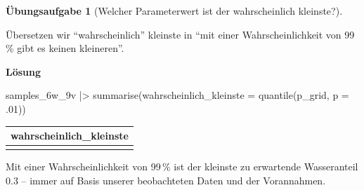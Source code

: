 \documentclass[
  ngerman,
  letterpaper,
  twoside,
  open=any]{scrbook}
\newenvironment{Shaded}{\begin{snugshade}}{\end{snugshade}}
\newcommand{\AttributeTok}[1]{\textcolor[rgb]{0.40,0.45,0.13}{#1}}
\newcommand{\DecValTok}[1]{\textcolor[rgb]{0.68,0.00,0.00}{#1}}
\newcommand{\FunctionTok}[1]{\textcolor[rgb]{0.28,0.35,0.67}{#1}}
\newcommand{\NormalTok}[1]{\textcolor[rgb]{0.00,0.23,0.31}{#1}}
\newcommand{\SpecialCharTok}[1]{\textcolor[rgb]{0.37,0.37,0.37}{#1}}
\newcounter{none} %
\theoremstyle{definition}
\theoremstyle{plain}
\theoremstyle{definition}
\newtheorem{exercise}{Übungsaufgabe}[chapter]
\theoremstyle{definition}
\theoremstyle{definition}
\theoremstyle{definition}
\newtheorem{exercise}{Übungsaufgabe}[chapter]
\theoremstyle{remark}
\begin{document}
\begin{exercise}[Welcher Parameterwert ist der wahrscheinlich
kleinste?]\protect\hypertarget{exr-quant2}{}\label{exr-quant2}

Übersetzen wir \enquote{wahrscheinlich} kleinste in \enquote{mit einer
Wahrscheinlichkeit von 99\,\% gibt es keinen kleineren}.

\begin{tcolorbox}[enhanced jigsaw, arc=.35mm, bottomrule=.15mm, breakable, colback=white, colframe=quarto-callout-tip-color-frame, left=2mm, leftrule=.75mm, opacityback=0, rightrule=.15mm, toprule=.15mm]

\vspace{-3mm}\textbf{Lösung}\vspace{3mm}

\begin{Shaded}
\begin{Highlighting}[]
\NormalTok{samples\_6w\_9v }\SpecialCharTok{|\textgreater{}} 
  \FunctionTok{summarise}\NormalTok{(}\AttributeTok{wahrscheinlich\_kleinste =} 
              \FunctionTok{quantile}\NormalTok{(p\_grid, }\AttributeTok{p =}\NormalTok{ .}\DecValTok{01}\NormalTok{))}
\end{Highlighting}
\end{Shaded}

{\def\LTcaptype{none} %
\begin{longtable}[]{@{}r@{}}
\toprule\noalign{}
wahrscheinlich\_kleinste \\
\midrule\noalign{}
\endhead
\bottomrule\noalign{}
\endlastfoot
0.3 \\
\end{longtable}
}

Mit einer Wahrscheinlichkeit von 99\,\% ist der kleinste zu erwartende
Wasseranteil 0.3 -- immer auf Basis unserer beobachteten Daten und der
Vorannahmen.

\end{tcolorbox}

\end{exercise}
\end{document}
